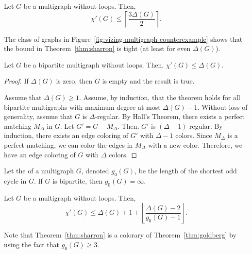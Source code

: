\begin{theorem}[Sharron] \label{thm:sharron}
    Let \(G\) be a multigraph without loops.
    Then,
    \begin{equation}
        \chi'(G) \leq \left\lceil \frac{3\Delta(G)}{2} \right\rceil.
    \end{equation}
\end{theorem}

The class of graphs in Figure~\ref{fig:vizing-multigraph-counterexample} shows that the bound in Theorem~\ref{thm:sharron} is tight (at least for even \(\Delta(G)\)).

\begin{theorem} \label{thm:bipartite-edge-coloring}
    Let \(G\) be a bipartite multigraph without loops.
    Then, \(\chi'(G) \leq \Delta(G)\).
\end{theorem}

\begin{proof}
    If \(\Delta(G)\) is zero, then \(G\) is empty and the result is true.

    Assume that \(\Delta(G) \geq 1\).
    Assume, by induction, that the theorem holds for all bipartite multigraphs with maximum degree at most \(\Delta(G) - 1\).
    Without loss of generality, assume that \(G\) is \(\Delta\)-regular.
    By Hall's Theorem, there exists a perfect matching \(M_\Delta\) in \(G\).
    Let \(G' = G - M_\Delta\).
    Then, \(G'\) is \((\Delta-1)\)-regular.
    By induction, there exists an edge coloring of \(G'\) with \(\Delta-1\) colors.
    Since \(M_\Delta\) is a perfect matching, we can color the edges in \(M_\Delta\) with a new color.
    Therefore, we have an edge coloring of \(G\) with \(\Delta\) colors.
\end{proof}

Let the  of a multigraph \(G\),
denoted \(g_0(G)\),
be the length of the shortest odd cycle in \(G\).
If \(G\) is bipartite, then \(g_0(G) = \infty\).

\begin{theorem}[Goldberg] \label{thm:goldberg}
    Let \(G\) be a multigraph without loops.
    Then,
    \begin{equation}
        \chi'(G) \leq \Delta(G) + 1 + \left\lfloor \frac{\Delta(G) - 2}{g_0(G) - 1} \right\rfloor.
    \end{equation}
\end{theorem}

Note that Theorem~\ref{thm:sharron} is a colorary of Theorem~\ref{thm:goldberg} by using the fact that \(g_0(G) \geq 3\).

